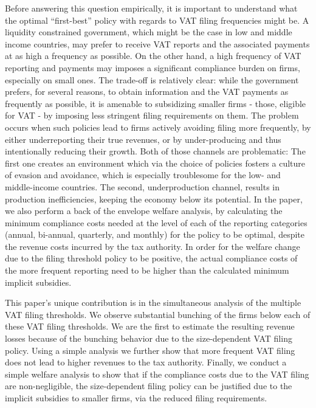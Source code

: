 Before answering this question empirically, it is important to understand what the optimal ``first-best'' policy with regards to VAT filing frequencies might be. A liquidity constrained government, which might be the case in low and middle income countries, may prefer to receive VAT reports and the associated payments at as high a frequency as possible. On the other hand, a high frequency of VAT reporting and payments may imposes a significant compliance burden on firms, especially on small ones. The trade-off is relatively clear: while the government prefers, for several reasons, to obtain information and the VAT payments as frequently as possible, it is amenable to subsidizing smaller firms - those, eligible for VAT - by imposing less stringent filing requirements on them. The problem occurs when such policies lead to firms actively avoiding filing more frequently, by either underreporting their true revenues, or by under-producing and thus intentionally reducing their growth. Both of those channels are problematic: The first one creates an environment which via the choice of policies fosters a culture of evasion and avoidance, which is especially troublesome for the low- and middle-income countries. The second, underproduction channel, results in production inefficiencies, keeping the economy below its potential. In the paper, we also perform a back of the envelope welfare analysis, by calculating the minimum compliance costs needed at the level of each of the reporting categories (annual, bi-annual, quarterly, and monthly) for the policy to be optimal, despite the revenue costs incurred by the tax authority. In order for the welfare change due to the filing threshold policy to be positive, the actual compliance costs of the more frequent reporting need to be higher than the calculated minimum implicit subsidies. 


This paper's unique contribution is in the simultaneous analysis of the multiple VAT filing thresholds. We observe substantial bunching of the firms below each of these VAT filing thresholds. We are the first to estimate the resulting revenue losses because of the bunching behavior due to the size-dependent VAT filing policy. Using a simple analysis we further show that more frequent VAT filing does not lead to higher revenues to the tax authority. Finally, we conduct a simple welfare analysis to show that if the compliance costs due to the VAT filing are non-negligible, the size-dependent filing policy can be justified due to the implicit subsidies to smaller firms, via the reduced filing requirements. 

